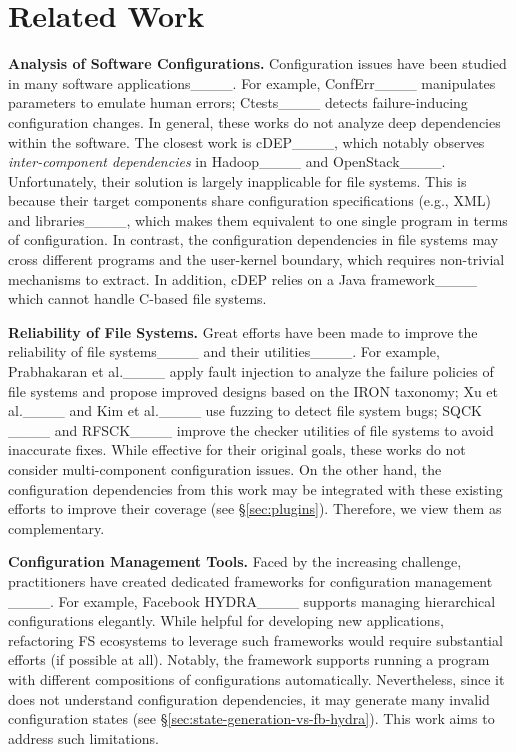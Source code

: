 \section{Related Work}
\label{sec:related}
\vspace{-0.05in}

\smallskip
\noindent
{\bf Analysis of Software Configurations.} 
Configuration issues have been  studied in many software applications____. 
For example, ConfErr____ manipulates parameters to emulate human errors;  
Ctests____ detects failure-inducing configuration changes.
In general, these works do not analyze deep   dependencies within the  software.
The closest work is {cDEP}____,
which notably observes \textit{inter-component dependencies} in  Hadoop____ and OpenStack____. Unfortunately, their solution is largely inapplicable for file systems. 
This is because their target components share   configuration specifications (e.g., XML)  and libraries____, which makes them equivalent to one single  program in terms of configuration. 
In contrast, 
the configuration dependencies in file systems may cross different programs and the user-kernel boundary, which requires  non-trivial mechanisms to extract.
In addition, cDEP relies on a Java   framework____ 
which cannot handle C-based file systems. 

\smallskip
\noindent
{\bf Reliability of File Systems.} 
Great efforts have been made to improve the reliability of 
file systems____ 
and  their  utilities____.
For example, 
Prabhakaran et al.____ apply fault injection to analyze the failure policies of  file
systems and propose improved designs based on the IRON taxonomy; 
Xu et al.____ and Kim et al.____ use fuzzing to detect file system bugs;  
SQCK ____ and RFSCK____ improve the checker utilities of file systems to avoid inaccurate fixes. 
 While effective for their original  goals, these works do not consider multi-component configuration issues. 
 On the other hand, the configuration dependencies from this work may be integrated with these existing efforts to improve their coverage (see \S\ref{sec:plugins}).  
 Therefore, we view them as complementary. 
 
\smallskip
\noindent
{\bf Configuration Management Tools.} Faced by the increasing  challenge, practitioners have created dedicated frameworks for configuration management 
____. 
For example,  
Facebook HYDRA____ supports managing hierarchical configurations elegantly. 
While helpful for developing new applications, refactoring FS ecosystems to leverage such frameworks would require substantial efforts (if possible at all).
Notably, the framework supports running a program with different compositions of configurations automatically. Nevertheless,  since it does not understand configuration dependencies, it may generate many invalid configuration states (see \S\ref{sec:state-generation-vs-fb-hydra}). This work aims to address such limitations.